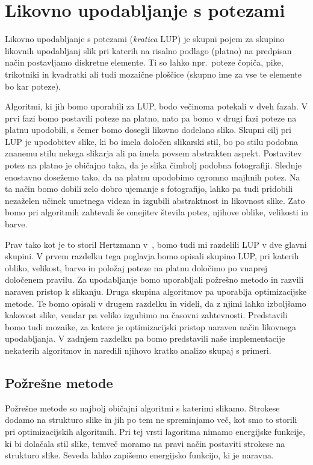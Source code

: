 \chapter{Likovno upodabljanje s potezami}
%
Likovno upodabljanje s potezami (\emph{kratica} LUP) je skupni pojem za skupino likovnih upodabljanj slik pri katerih na risalno podlago (platno) na predpisan način postavljamo diskretne elemente. Ti so lahko npr.~poteze čopiča, pike, trikotniki in kvadratki ali tudi mozaične ploščice (skupno ime za vse te elemente bo kar poteze).

Algoritmi, ki jih bomo uporabili za LUP, bodo večinoma potekali v dveh fazah. V prvi fazi bomo postavili poteze na platno, nato pa bomo v drugi fazi poteze na platnu upodobili, s čemer bomo dosegli likovno dodelano sliko. Skupni cilj pri LUP je upodobitev slike, ki bo imela določen slikarski stil, bo po stilu podobna znanemu stilu nekega slikarja ali pa imela povsem abstrakten aspekt. Postavitev potez na platno je običajno taka, da je slika čimbolj podobna fotografiji. Slednje enostavno dosežemo tako, da na platnu upodobimo %
ogromno majhnih potez. Na ta način bomo dobili zelo dobro ujemanje s fotografijo, lahko pa tudi pridobili nezaželen učinek umetnega videza in izgubili abstraktnost in likovnost slike. Zato bomo pri algoritmih zahtevali še omejitev števila potez, njihove oblike, velikosti in barve.

Prav tako kot je to storil Hertzmann v~\cite{Hertzmann}, %
bomo tudi mi razdelili LUP v dve glavni skupini. V prvem razdelku tega poglavja bomo opisali skupino LUP, pri katerih obliko, velikost, barvo in položaj poteze na platnu določimo po vnaprej določenem pravilu. Za upodabljanje bomo uporabljali požrešno metodo in razvili naraven pristop k slikanju. Druga skupina algoritmov pa uporablja optimizacijske metode. Te bomo opisali v drugem razdelku in videli, da z njimi lahko izboljšamo kakovost slike, vendar pa veliko izgubimo na časovni zahtevnosti. Predstavili bomo tudi mozaike, za katere je optimizacijski pristop naraven način likovnega upodabljanja. V zadnjem razdelku pa bomo predstavili naše implementacije nekaterih algoritmov in naredili njihovo kratko analizo skupaj s primeri. 
\section{Požrešne metode}
Požrešne metode so najbolj običajni algoritmi s katerimi slikamo. Strokese dodamo na strukturo slike in jih po tem ne spreminjamo več, kot smo to storili pri optimizacijskih algoritmih. Pri tej vrsti lagoritma nimamo energijske funkcije, ki bi dolačala stil slike, temveč moramo na pravi način postaviti strokese na strukturo slike. Seveda lahko zapišemo energijsko funkcijo, ki je naravna.

